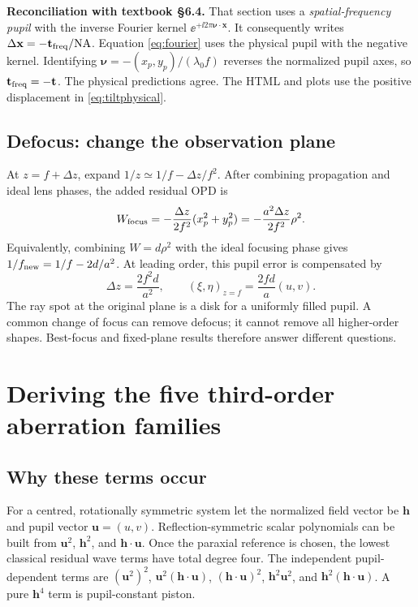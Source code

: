 \textbf{Reconciliation with textbook \S6.4.} That section uses a \emph{spatial-frequency pupil} with the inverse Fourier kernel $\ee^{+\ii2\pi\boldsymbol\nu\cdot\mathbf x}$. It consequently writes $\Delta\mathbf x=-\mathbf t_{\rm freq}/\mathrm{NA}$. Equation \eqref{eq:fourier} uses the physical pupil with the negative kernel. Identifying $\boldsymbol\nu=-(x_p,y_p)/(\lambda_0 f)$ reverses the normalized pupil axes, so $\mathbf t_{\rm freq}=-\mathbf t$. The physical predictions agree. The HTML and plots use the positive displacement in \eqref{eq:tiltphysical}.

\subsection{Defocus: change the observation plane}
At $z=f+\Delta z$, expand $1/z\simeq1/f-\Delta z/f^2$. After combining propagation and ideal lens phases, the added residual OPD is
\begin{equation}
W_{\rm focus}=-\frac{\Delta z}{2f^2}(x_p^2+y_p^2)
=-\frac{a^2\Delta z}{2f^2}\rho^2.
\label{eq:focus}
\end{equation}
Equivalently, combining $W=d\rho^2$ with the ideal focusing phase gives $1/f_{\rm new}=1/f-2d/a^2$. At leading order, this pupil error is compensated by
\begin{equation}
\Delta z=\frac{2f^2d}{a^2},\qquad
(\xi,\eta)_{z=f}=\frac{2fd}{a}(u,v).
\end{equation}
The ray spot at the original plane is a disk for a uniformly filled pupil. A common change of focus can remove defocus; it cannot remove all higher-order shapes. Best-focus and fixed-plane results therefore answer different questions.

\section{Deriving the five third-order aberration families}
\subsection{Why these terms occur}
For a centred, rotationally symmetric system let the normalized field vector be $\mathbf h$ and pupil vector $\mathbf u=(u,v)$. Reflection-symmetric scalar polynomials can be built from $\mathbf u^2$, $\mathbf h^2$, and $\mathbf h\cdot\mathbf u$. Once the paraxial reference is chosen, the lowest classical residual wave terms have total degree four. The independent pupil-dependent terms are
$(\mathbf u^2)^2$, $\mathbf u^2(\mathbf h\cdot\mathbf u)$,
$(\mathbf h\cdot\mathbf u)^2$, $\mathbf h^2\mathbf u^2$, and
$\mathbf h^2(\mathbf h\cdot\mathbf u)$. A pure $\mathbf h^4$ term is pupil-constant piston.

